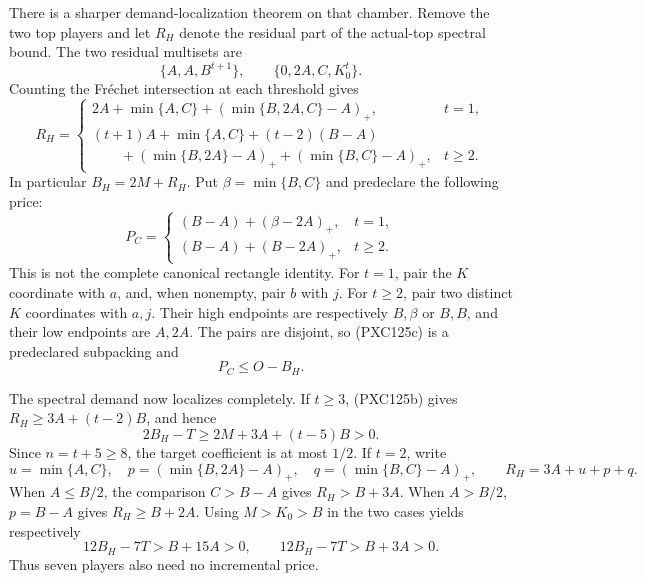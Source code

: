 \documentclass[11pt]{article}
\begin{document}
There is a sharper demand-localization theorem on that chamber.  Remove the
two top players and let \(R_H\) denote the residual part of the actual-top
spectral bound.  The two residual multisets are
\[
 \{A,A,B^{t+1}\},\qquad \{0,2A,C,K_0^t\}.
\]
Counting the Fr\'echet intersection at each threshold gives
\begin{equation}
R_H=\begin{cases}
2A+\min\{A,C\}+(\min\{B,2A,C\}-A)_+,&t=1,\\[2mm]
(t+1)A+\min\{A,C\}+(t-2)(B-A)\\
\qquad +(\min\{B,2A\}-A)_+ +(\min\{B,C\}-A)_+,&t\ge2.
\end{cases}                                             \tag{PXC125b}
\end{equation}
In particular \(B_H=2M+R_H\).  Put \(\beta=\min\{B,C\}\) and predeclare
the following price:
\begin{equation}
 P_C=\begin{cases}
 (B-A)+(\beta-2A)_+,&t=1,\\
 (B-A)+(B-2A)_+,&t\ge2.
 \end{cases}                                            \tag{PXC125c}
\end{equation}
This is not the complete canonical rectangle identity.  For \(t=1\), pair
the \(K\) coordinate with \(a\), and, when nonempty, pair \(b\) with \(j\).
For \(t\ge2\), pair two distinct \(K\) coordinates with \(a,j\).  Their high
endpoints are respectively \(B,\beta\) or \(B,B\), and their low endpoints
are \(A,2A\).  The pairs are disjoint, so (PXC125c) is a predeclared
subpacking and
\begin{equation}
                       P_C\le O-B_H.                 \tag{PXC125d}
\end{equation}

The spectral demand now localizes completely.  If \(t\ge3\), (PXC125b)
gives \(R_H\ge3A+(t-2)B\), and hence
\[
 2B_H-T\ge2M+3A+(t-5)B>0.
\]
Since \(n=t+5\ge8\), the target coefficient is at most \(1/2\).  If \(t=2\),
write
\[
 u=\min\{A,C\},\quad
 p=(\min\{B,2A\}-A)_+,\quad
 q=(\min\{B,C\}-A)_+,
 \qquad R_H=3A+u+p+q.
\]
When \(A\le B/2\), the comparison \(C>B-A\) gives
\(R_H>B+3A\).  When \(A>B/2\), \(p=B-A\) gives
\(R_H\ge B+2A\).  Using \(M>K_0>B\) in the two cases yields respectively
\begin{equation}
 12B_H-7T>B+15A>0,\qquad
 12B_H-7T>B+3A>0.                                  \tag{PXC125e}
\end{equation}
Thus seven players also need no incremental price.
\end{document}
